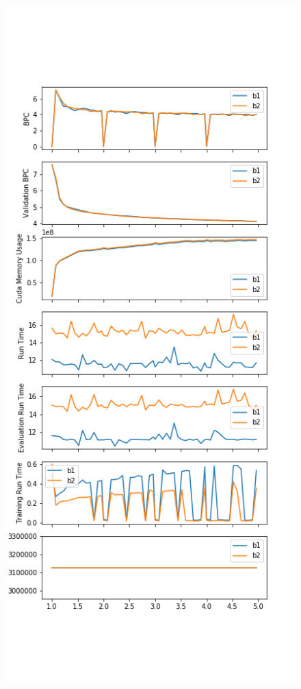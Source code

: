 \begin{figure}[H]
\includegraphics[height=.85\textheight]{parts/appendix/reports-gmsnn/docs_esteban-latex/test_reports/2018-06-15/2018_06_15_frac.png}
\end{figure}


